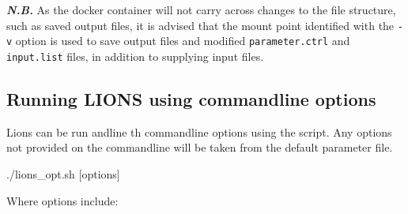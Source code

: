 \documentclass[11pt]{scrartcl}
\begin{document}
\textit{\textbf{N.B.}} As the docker container will not carry across changes to the file structure, such as saved output files, it is advised that the mount point identified with the \texttt{-v} option is used to save output files and modified \texttt{parameter.ctrl} and \texttt{input.list} files, in addition to supplying input files.

\newpage
\subsection{Running LIONS using commandline options}

Lions can be run andline th commandline options using the  script. Any options not provided on the commandline will be taken from the default parameter file.
\begin{bash}
./lions_opt.sh [options]
\end{bash}

Where options include:
\end{document}

